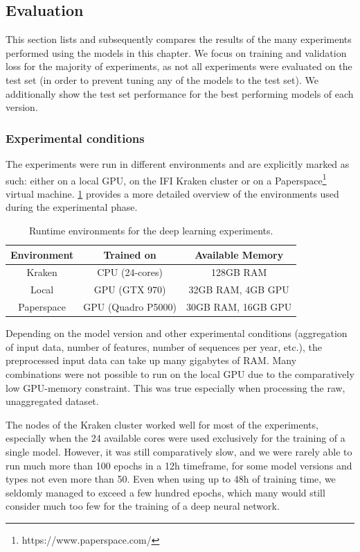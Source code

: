 \clearpage
\subsection{Evaluation}
\label{sst:nn_results}
This section lists and subsequently compares the results of the many experiments performed using the models in this chapter. We focus on training and validation loss for the majority of experiments, as not all experiments were evaluated on the test set (in order to prevent tuning any of the models to the test set). We additionally show the test set performance for the best performing models of each version.

\subsubsection{Experimental conditions}
\label{ssst:experimental_conditions}
The experiments were run in different environments and are explicitly marked as such: either on a local GPU, on the IFI Kraken cluster or on a Paperspace\footnote{https://www.paperspace.com/} virtual machine. \cref{tab:experimental_environments} provides a more detailed overview of the environments used during the experimental phase.

\begin{table}[h]
  \centering
  \begin{tabular}{ |c|c|c| }
    \hline
    Environment & Trained on & Available Memory \\
    \hline
    Kraken & CPU (24-cores) & 128GB RAM \\
    Local & GPU (GTX 970) & 32GB RAM, 4GB GPU \\
    Paperspace & GPU (Quadro P5000) & 30GB RAM, 16GB GPU \\
    \hline
  \end{tabular}
  \caption{Runtime environments for the deep learning experiments.}
  \label{tab:experimental_environments}
\end{table}

Depending on the model version and other experimental conditions (aggregation of input data, number of features, number of sequences per year, etc.), the preprocessed input data can take up many gigabytes of RAM. Many combinations were not possible to run on the local GPU due to the comparatively low GPU-memory constraint. This was true especially when processing the raw, unaggregated dataset.

The nodes of the Kraken cluster worked well for most of the experiments, especially when the 24 available cores were used exclusively for the training of a single model. However, it was still comparatively slow, and we were rarely able to run much more than 100 epochs in a 12h timeframe, for some model versions and types not even more than 50. Even when using up to 48h of training time, we seldomly managed to exceed a few hundred epochs, which many would still consider much too few for the training of a deep neural network.

